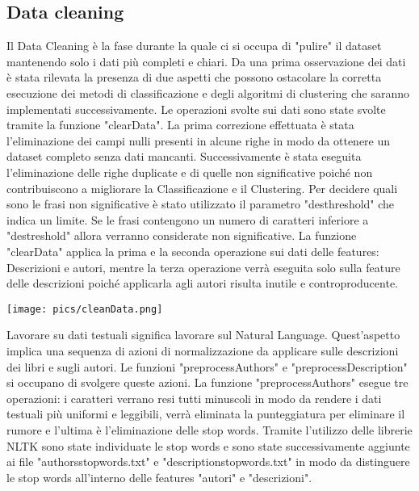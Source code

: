 \documentclass[12pt,oneside]{article}
\begin{document}
    \begin{enumerate}
    \subsection{Data cleaning}
    \begin{justify}
    Il Data Cleaning è la fase durante la quale ci si occupa di "pulire" il dataset mantenendo solo i dati più completi e chiari. Da una prima osservazione dei dati è stata rilevata la presenza di due aspetti che possono ostacolare la corretta esecuzione dei metodi di classificazione e degli algoritmi di clustering che saranno implementati successivamente. Le operazioni svolte sui dati sono state svolte tramite la funzione "clearData". La prima correzione effettuata è stata l'eliminazione dei campi nulli presenti in alcune righe in modo da ottenere un dataset completo senza dati mancanti. Successivamente è stata eseguita l'eliminazione delle righe duplicate e di quelle non significative poiché non contribuiscono a migliorare la Classificazione e il Clustering. Per decidere quali sono le frasi non significative è stato utilizzato il parametro "des\textunderscore{}threshold" che indica un limite. Se le frasi contengono un numero di caratteri inferiore a "des\textunderscore{}treshold" allora verranno considerate non significative. La funzione "clearData" applica la prima e la seconda operazione sui dati delle features: Descrizioni e autori, mentre la terza operazione verrà eseguita solo sulla feature delle descrizioni poiché applicarla agli autori risulta inutile e controproducente. 
    \end{justify}
    \texttt{[image: pics/cleanData.png]}
    \begin{justify}
    Lavorare su dati testuali significa lavorare sul Natural Language. Quest'aspetto implica una sequenza di azioni di normalizzazione da applicare sulle descrizioni dei libri e sugli autori. Le funzioni "preprocessAuthors" e "preprocessDescription" si occupano di svolgere queste azioni. La funzione "preprocessAuthors" esegue tre operazioni: i caratteri verrano resi tutti minuscoli in modo da rendere i dati testuali più uniformi e leggibili, verrà eliminata la punteggiatura per eliminare il rumore e l'ultima è l'eliminazione delle stop words. Tramite l'utilizzo delle librerie NLTK sono state individuate le stop words e sono state successivamente aggiunte ai file "authors\textunderscore{}stopwords.txt" e "description\textunderscore{}stopwords.txt" in modo da distinguere le stop words all'interno delle features "autori" e "descrizioni". 

\end{justify}
\end{enumerate}
\end{document}
